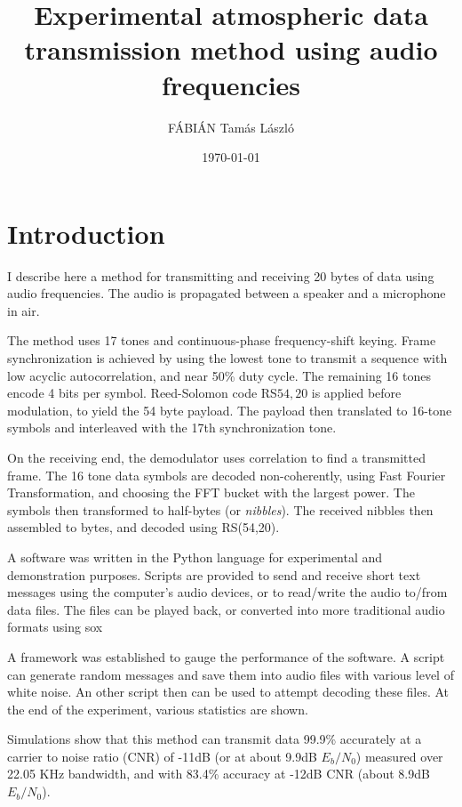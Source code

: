 \documentclass[a4paper]{article}
\title{Experimental atmospheric data transmission method using audio frequencies}
\author{FÁBIÁN Tamás László}
\date{\today}
\begin{document}
\maketitle

\begin{abstract}

\end{abstract}

\section{Introduction}
\label{sec:introduction}
I describe here a method for transmitting and receiving 20 bytes of data using audio frequencies. The audio is propagated between a speaker and a microphone in air.

The method uses 17 tones and continuous-phase frequency-shift keying. Frame synchronization is achieved by using the lowest tone to transmit a sequence with low acyclic autocorrelation, and near 50\% duty cycle. The remaining 16 tones encode 4 bits per symbol. Reed-Solomon code RS\(54,20\) is applied before modulation, to yield the 54 byte payload. The payload then translated to 16-tone symbols and interleaved with the 17th synchronization tone.

On the receiving end, the demodulator uses correlation to find a transmitted frame. The 16 tone data symbols are decoded non-coherently, using Fast Fourier Transformation, and choosing the FFT bucket with the largest power. The symbols then transformed to half-bytes (or \textit{nibbles}). The received nibbles then assembled to bytes, and decoded using RS(54,20).

A software was written in the Python language for experimental and demonstration purposes. Scripts are provided to send and receive short text messages using the computer's audio devices, or to read/write the audio to/from data files. The files can be played back, or converted into more traditional audio formats using sox\cite{sox1}

A framework was established to gauge the performance of the software. A script can generate random messages and save them into audio files with various level of white noise. An other script then can be used to attempt decoding these files. At the end of the experiment, various statistics are shown.

Simulations show that this method can transmit data 99.9\% accurately at a carrier to noise ratio (CNR) of -11dB (or at about 9.9dB $E_b/N_0$) measured over 22.05 KHz bandwidth, and with 83.4\% accuracy at -12dB CNR (about 8.9dB $E_b/N_0$).
\end{document}

